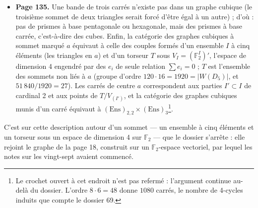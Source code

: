 \documentclass[11pt,a4paper]{article}
\begin{document}
\begin{itemize}
  $(\mathrm{Ens})_2 \times (\mathrm{Ens})_3 \times (\mathrm{Ens})_3$, d'ordre 72,
  soit 720 prismes (le nombre du dossier 69). \textbf{Bicarrés} : $(\mathrm{Ens})_2
  \times (\mathrm{Ens})_2 \times (\mathrm{Ens})_2 \simeq \mathrm{Tors}((\pm 1)^3)$,
  et $\frac12 (720 \times 6 \times 3) = 2^4 \cdot 3^4 \cdot 5 = 51\,840/8$.
\item \textbf{Page 135.} Une bande de trois carrés n'existe pas dans un graphe
  cubique (le troisième sommet de deux triangles serait forcé d'être égal à un
  autre) ; d'où : pas de prismes à base pentagonale ou hexagonale, mais des
  prismes à base carrée, c'est-à-dire des cubes. Enfin, la catégorie des graphes
  cubiques à sommet marqué $a$ équivaut à celle des couples formés d'un ensemble
  $I$ à cinq éléments (les triangles en $a$) et d'un torseur $T$ sous $V_I =
  (\mathbb{F}_2^I)'$, l'espace de dimension 4 engendré par des $e_i$ de seule
  relation $\sum e_i = 0$ ; $T$ est l'ensemble des sommets non liés à $a$
  (groupe d'ordre $120 \cdot 16 = 1920 = |W(D_5)|$, et $51\,840/1920 = 27$). Les
  carrés de centre $a$ correspondent aux parties $I' \subset I$ de cardinal 2 et
  aux points de $T/V_{(I')}$, et la catégorie des graphes cubiques munis d'un
  carré équivaut à $(\mathrm{Ens})_{2,2} \times (\mathrm{Ens})_3$\footnote{Le
  crochet ouvert à cet endroit n'est pas refermé : l'argument continue au-delà du
  dossier. L'ordre $8 \cdot 6 = 48$ donne $1080$ carrés, le nombre de 4-cycles
  induits que compte le dossier 69.}.
\end{itemize}

C'est sur cette description autour d'un sommet --- un ensemble à cinq éléments et
un torseur sous un espace de dimension 4 sur $\mathbb{F}_2$ --- que le dossier
s'arrête : elle rejoint le graphe de la page 18, construit sur un
$\mathbb{F}_2$-espace vectoriel, par lequel les notes sur les vingt-sept avaient
commencé.
\end{document}
